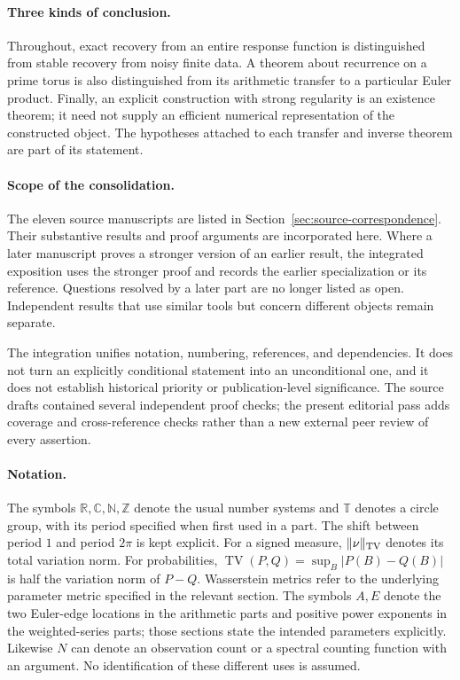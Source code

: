 \documentclass[11pt,letterpaper]{article}
\theoremstyle{definition}
\theoremstyle{remark}
\newcommand{\T}{\mathbb T}
\newcommand{\R}{\mathbb R}
\newcommand{\C}{\mathbb C}
\newcommand{\N}{\mathbb N}
\newcommand{\Z}{\mathbb Z}
\newcommand{\1}{\mathbf 1}
\begin{document}
\paragraph{Three kinds of conclusion.}
Throughout, exact recovery from an entire response function is
distinguished from stable recovery from noisy finite data. A theorem
about recurrence on a prime torus is also distinguished from its
arithmetic transfer to a particular Euler product. Finally, an explicit
construction with strong regularity is an existence theorem; it need
not supply an efficient numerical representation of the constructed
object. The hypotheses attached to each transfer and inverse theorem
are part of its statement.

\paragraph{Scope of the consolidation.}
The eleven source manuscripts are listed in
Section~\ref{sec:source-correspondence}. Their substantive results and
proof arguments are incorporated here. Where a later manuscript proves
a stronger version of an earlier result, the integrated exposition uses
the stronger proof and records the earlier specialization or its
reference. Questions resolved by a later part are no longer listed as
open. Independent results that use similar tools but concern different
objects remain separate.

The integration unifies notation, numbering, references, and dependencies.
It does not turn an explicitly conditional statement into an unconditional
one, and it does not establish historical priority or publication-level
significance. The source drafts contained several independent proof
checks; the present editorial pass adds coverage and cross-reference
checks rather than a new external peer review of every assertion.

\paragraph{Notation.}
The symbols $\R,\C,\N,\Z$ denote the usual number systems and $\T$
denotes a circle group, with its period specified when first used in a
part. The shift between period $1$ and period $2\pi$ is kept explicit.
For a signed measure, $\|\nu\|_{\rm TV}$ denotes its total variation
norm. For probabilities, $\operatorname{TV}(P,Q)=\sup_B|P(B)-Q(B)|$
is half the variation norm of $P-Q$. Wasserstein metrics refer to
the underlying parameter metric specified in the relevant section.
The symbols $A,E$ denote the two Euler-edge locations in the arithmetic
parts and positive power exponents in the weighted-series parts;
those sections state the intended parameters explicitly. Likewise
$N$ can denote an observation count or a spectral counting function
with an argument. No identification of these different uses is assumed.
\end{document}
